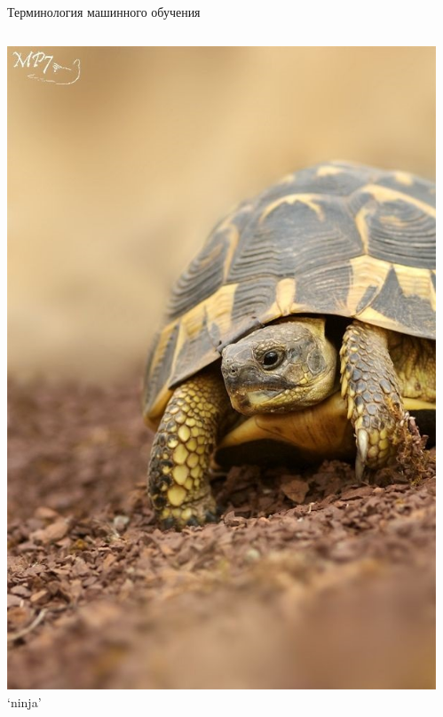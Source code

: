 \documentclass[aspectratio=169, professionalfonts]{beamer}
\begin{document}
\begin{frame}{Терминология машинного обучения}
\begin{columns}
\begin{column}{.1\linewidth}
            \includegraphics[width=\linewidth]{graphs/fig17_3.jpg}
            `ninja'
        \end{column}
        \begin{column}{.1\linewidth}
            \centering

\end{column}
\end{columns}
\end{frame}
\end{document}

